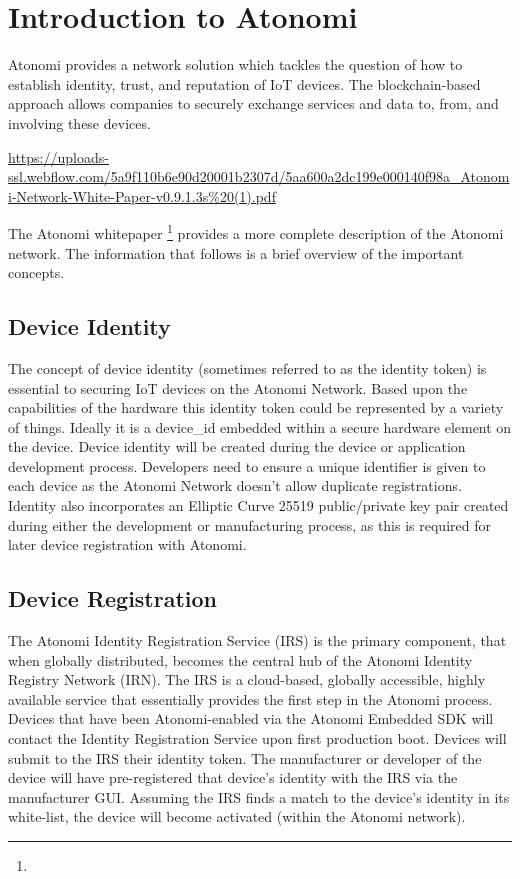 \chapter{Introduction to Atonomi}

Atonomi provides a network solution which tackles the question of how to
establish identity, trust, and reputation of IoT devices. The blockchain-based
approach allows companies to securely exchange services and data to, from, and
involving these devices.

\urldef{\atmiwpurl}\url{https://uploads-ssl.webflow.com/5a9f110b6e90d20001b2307d/5aa600a2dc199e000140f98a_Atonomi-Network-White-Paper-v0.9.1.3s%20(1).pdf}

The Atonomi whitepaper \footnote{\atmiwpurl}
provides a more complete description of the Atonomi network. The information
that follows is a brief overview of the important concepts.


\section{Device Identity}
The concept of device identity (sometimes referred to as the identity token)
is essential to securing IoT devices on the Atonomi Network. Based upon the
capabilities of the hardware this identity token could be represented by a
variety of things. Ideally it is a device_id embedded within a secure hardware
element on the device. Device identity will be created during the device or
application development process. Developers need to ensure a unique identifier
is given to each device as the Atonomi Network doesn't allow duplicate
registrations. Identity also incorporates an Elliptic Curve 25519 public/private
key pair created during either the development or manufacturing process,
as this is required for later device registration with Atonomi.


\section{Device Registration}
The Atonomi Identity Registration Service (IRS) is the primary component,
that when globally distributed, becomes the central hub of the Atonomi Identity
Registry Network (IRN). The IRS is a cloud-based, globally accessible, highly
available service that essentially provides the first step in the
Atonomi process. Devices that have been Atonomi-enabled via the Atonomi Embedded
SDK will contact the Identity Registration Service upon first production boot.
Devices will submit to the IRS their identity token. The manufacturer or
developer of the device will have pre-registered that device's identity with the
IRS via the manufacturer GUI. Assuming the IRS finds a match to the device's
identity in its white-list, the device will become activated (within the
Atonomi network).


